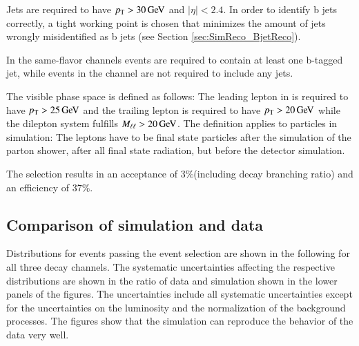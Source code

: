 Jets are required to have $p_{\mathrm{T}} > 30 \,\text{Ge\hspace{-.08em}V}$ and $|\eta|<2.4$. In order to identify b jets correctly, a tight working point is chosen that minimizes the amount of jets wrongly misidentified as b jets (see Section \ref{sec:SimReco_BjetReco}).

In the same-flavor channels events are required to contain at least one b-tagged jet, while events in the \emu channel are not required to include any jets.

The visible phase space is defined as follows: The leading lepton in \pt is required to have $p_{\mathrm{T}} > 25 \,\text{Ge\hspace{-.08em}V}$ and the trailing lepton is required to have $p_{\mathrm{T}} > 20 \,\text{Ge\hspace{-.08em}V}$ while the dilepton system fulfills $M_{\ell\ell} > 20 \,\text{Ge\hspace{-.08em}V}$. 
The definition applies to particles in simulation: The leptons have to be final state particles after the simulation of the parton shower,
after all final state radiation, but before the detector simulation.

The selection results in an acceptance of $3\%$(including \ttbar decay branching ratio) and an efficiency of $37\%$.

\subsection{Comparison of simulation and data}
\label{sec:xsec_datamc}

Distributions for events passing the event selection are shown in the following for all three decay channels. 
The systematic uncertainties affecting the respective distributions are shown in the ratio of data and simulation shown in the lower panels of the figures. 
The uncertainties include all systematic uncertainties except for the uncertainties on the luminosity and the normalization of the background processes.
The figures show that the simulation can reproduce the behavior of the data very well. 


